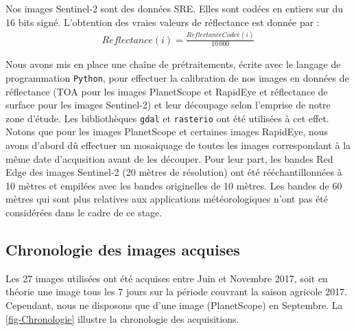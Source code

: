 \vspace{5mm}

Nos images Sentinel-2 sont des données SRE. Elles sont codées en entiers sur du 16 bits signé. L'obtention des vraies valeurs de réflectance est donnée par :
\begin{align}
  Reflectance (i) =  \frac{ReflectanceCodee(i)}{10\,000}
\end{align}

\vspace{5mm}
 
Nous avons mis en place une chaîne de prétraitements, écrite avec le langage de programmation \texttt{Python}, pour effectuer la calibration de nos images en données de 
réflectance (TOA pour les images PlanetScope et RapidEye et réflectance de surface pour les images Sentinel-2) et leur découpage selon l'emprise de notre zone d'étude. 
Les bibliothèques \texttt{gdal} et \texttt{rasterio} ont été utilisées à cet effet. Notons que pour les images PlanetScope et certaines images RapidEye, nous avons d'abord dû 
effectuer un mosaiquage de toutes les images correspondant à la même date d'acqusition avant de les découper. Pour leur part, les bandes Red Edge des images Sentinel-2 (20 mètres 
de résolution) ont été rééchantillonnées à 10 mètres et empilées avec les bandes originelles de 10 mètres. Les bandes de 60 mètres qui sont plus relatives aux applications 
météorologiques n'ont pas été considérées dans le cadre de ce stage.

  \subsection{Chronologie des images acquises}
  
Les 27 images utilisées ont été acquises entre Juin et Novembre 2017, soit en théorie une image tous les 7 jours sur la période couvrant la saison agricole 2017. Cependant, nous ne disposons que d'une image (PlanetScope) en Septembre. La \cref{fig-Chronologie} illustre la chronologie des acquisitions.

